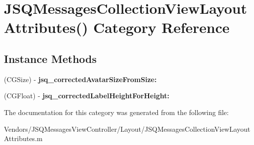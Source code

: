 \hypertarget{category_j_s_q_messages_collection_view_layout_attributes_07_08}{}\section{J\+S\+Q\+Messages\+Collection\+View\+Layout\+Attributes() Category Reference}
\label{category_j_s_q_messages_collection_view_layout_attributes_07_08}
\subsection*{Instance Methods}
\begin{DoxyCompactItemize}
\item 
\hypertarget{category_j_s_q_messages_collection_view_layout_attributes_07_08_a1c0cc557510d1ce5487fbe5d58411b15}{}(C\+G\+Size) -\/ {\bfseries jsq\+\_\+corrected\+Avatar\+Size\+From\+Size\+:}\label{category_j_s_q_messages_collection_view_layout_attributes_07_08_a1c0cc557510d1ce5487fbe5d58411b15}

\item 
\hypertarget{category_j_s_q_messages_collection_view_layout_attributes_07_08_a258fc5b475c35afa935d6db3498325a0}{}(C\+G\+Float) -\/ {\bfseries jsq\+\_\+corrected\+Label\+Height\+For\+Height\+:}\label{category_j_s_q_messages_collection_view_layout_attributes_07_08_a258fc5b475c35afa935d6db3498325a0}

\end{DoxyCompactItemize}


The documentation for this category was generated from the following file\+:\begin{DoxyCompactItemize}
\item 
Vendors/\+J\+S\+Q\+Messages\+View\+Controller/\+Layout/J\+S\+Q\+Messages\+Collection\+View\+Layout\+Attributes.\+m\end{DoxyCompactItemize}
